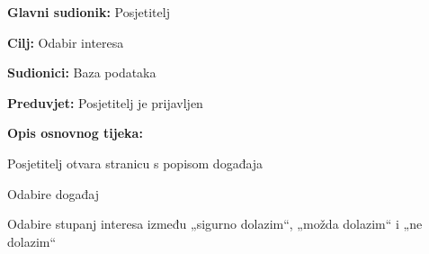 					\noindent {}
					\begin{packed_item}
	
						\item \textbf{Glavni sudionik:} Posjetitelj
						\item  \textbf{Cilj:} Odabir interesa
						\item  \textbf{Sudionici:} Baza podataka
						\item  \textbf{Preduvjet:} Posjetitelj je prijavljen
						\item  \textbf{Opis osnovnog tijeka:}
						
						\item[] \begin{packed_enum}
	
							\item Posjetitelj otvara stranicu s popisom događaja
							\item Odabire događaj
							\item Odabire stupanj interesa između „sigurno dolazim“, „možda dolazim“ i „ne dolazim“

						\end{packed_enum}
					\end{packed_item}

